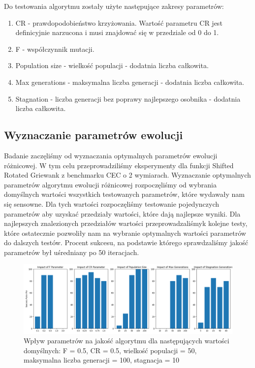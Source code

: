 \documentclass{article}
\begin{document}
Do testowania algorytmu zostały użyte następujące zakresy parametrów:

\begin{enumerate}
    \item CR - prawdopodobieństwo krzyżowania. Wartość parametru CR jest definicyjnie narzucona i musi znajdować się w przedziale od 0 do 1.
    \item F - współczynnik mutacji.
    \item Population size - wielkość populacji - dodatnia liczba całkowita.
    \item Max generations - maksymalna liczba generacji - dodatnia liczba całkowita.
    \item Stagnation - liczba generacji bez poprawy najlepszego osobnika - dodatnia liczba całkowita.
\end{enumerate}

\subsection{Wyznaczanie parametrów ewolucji}

Badanie zaczęliśmy od wyznaczania optymalnych parametrów ewolucji różnicowej. W tym celu przeprowadziliśmy eksperymenty dla funkcji Shifted Rotated Griewank z benchmarku CEC o 2 wymiarach. Wyznaczanie optymalnych parametrów algorytmu ewolucji różnicowej rozpoczęliśmy od wybrania domyślnych wartości wszystkich testowanych parametrów, które wydawały nam się sensowne. Dla tych wartości rozpoczęliśmy testowanie pojedynczych parametrów aby uzyskać przedziały wartości, które dają najlepsze wyniki. Dla najlepszych znalezionych przedziałów wartości przeprowadzaliśmyk kolejne testy, które ostatecznie pozwoliły nam na wybranie optymalnych wartości parametrów do dalszych testów. Procent sukcesu, na podstawie którego sprawdzaliśmy jakość parametrów był uśredniany po 50 iteracjach.

\begin{figure}[H]
    \centering
    \includegraphics[width=\textwidth]{parameter_tuning_results_separate1.png}
    \caption{Wpływ parametrów na jakość algorytmu dla następujących wartości domyślnych: F = 0.5, CR = 0.5, wielkość populacji = 50, maksymalna liczba generacji = 100, stagnacja = 10}
    \label{fig:parameter_results1}
\end{figure}
\end{document}
